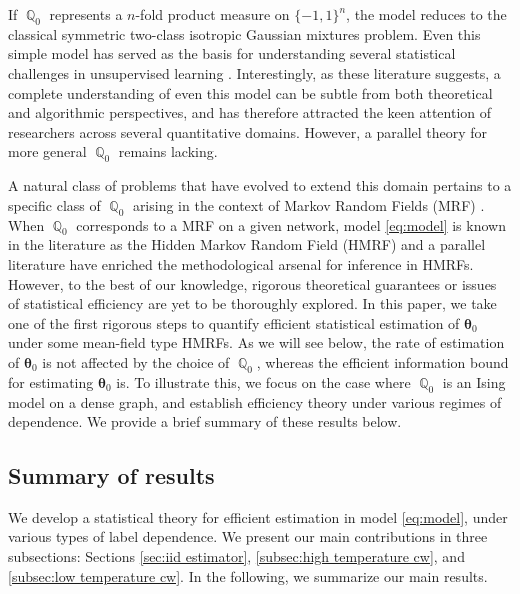 \documentclass[preprint,reqno]{imsart}
\newcommand{\ttheta}{\boldsymbol{\theta}}
\DeclareMathOperator{\QQ}{\mathbb{Q}}
\begin{document}
%
If $\QQ_{0}$ represents a $n$-fold product measure on $\{-1,1\}^n$, the model reduces to the classical symmetric two-class isotropic Gaussian mixtures problem. Even this simple model has served as the basis for understanding several statistical challenges in unsupervised learning \citep[][and the references therein]{daskalakis2017ten, balakrishnan2017statistical, wu2020optimal, wu2021randomly, ndaoud2022sharp}. Interestingly, as these literature suggests, 
a complete understanding of even this model can be subtle from both theoretical and algorithmic perspectives, and has therefore attracted the keen attention of researchers across several quantitative domains. %
However, a parallel theory for more general $\QQ_0$ remains lacking. 

A natural class of problems that have evolved to extend this domain pertains to a specific class of $\QQ_0$ arising in the context of Markov Random Fields (MRF) \citep{clifford1971markov, besag1974spatial}. When $\QQ_0$ corresponds to a MRF on a given network, model \eqref{eq:model} is known in the literature as the Hidden Markov Random Field (HMRF) \citep{kunsch1995hidden, besag1986statistical} and a parallel literature have enriched the methodological arsenal for inference in HMRFs. However, to the best of our knowledge, rigorous theoretical guarantees or issues of statistical efficiency are yet to be thoroughly explored. In this paper, we take one of the first rigorous steps to quantify efficient statistical estimation of $\ttheta_0$ under some mean-field type HMRFs. %
As we will see below, the rate of estimation of $\ttheta_0$ is not affected by the choice of $\QQ_0$, whereas the efficient information bound for estimating $\ttheta_0$ is. To illustrate this, we focus on the case where $\QQ_0$ is an Ising model on a dense graph, and 
%
establish efficiency theory under various regimes of dependence. %
We provide a brief summary of these results below.





\subsection{Summary of results}
We develop a statistical theory for efficient estimation in model \eqref{eq:model}, under various types of label dependence.
We present our main contributions in three subsections: Sections \ref{sec:iid estimator}, \ref{subsec:high temperature cw}, and \ref{subsec:low temperature cw}. In the following, we summarize our main results.
\end{document}
